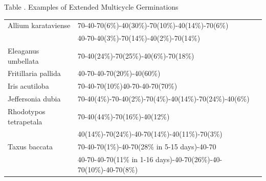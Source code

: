 \begin{table}[h]
\begin{center}
Table \thetable. Examples of Extended Multicycle Germinations
\end{center}
\par
\begin{tabular}{|l|l|}
\hline
Allium karataviense & 70-40-70(6\%)-40(30\%)-70(10\%)-40(14\%)-70(6\%) \\
                    & 40-70-40(3\%)-70(14\%)-40(2\%)-70(14\%) \\
Eleaganus umbellata & 70-40(24\%)-70(25\%)-40(6\%)-70(18\%) \\
Fritillaria pallida & 40-70-40-70(20\%)-40(60\%) \\
Iris acutiloba & 70-40-70(10\%)40-70-40-70(70\%) \\
Jeffersonia dubia & 70-40(4\%)-70-40(2\%)-70(4\%)-40(14\%)-70(24\%)-40(6\%) \\
Rhodotypos tetrapetala & 70-40(44\%)-70(16\%)-40(12\%) \\
                       & 40(14\%)-70(24\%)-40-70(14\%)-40(11\%)-70(3\%) \\
Taxus baccata       & 70-40-70(1\%)-40-70(28\% in 5-15 days)-40-70 \\
                    & 40-70-40-70(11\% in 1-16 days)-40-70(26\%)-40-70(10\%)-40-70(8\%) \\
\hline
\end{tabular}
\label{table:smc}
\end{table}

